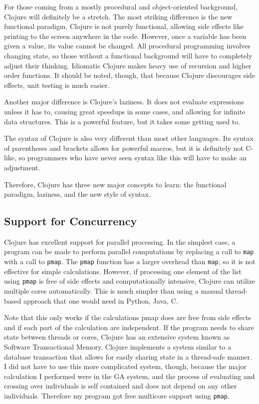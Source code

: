 \documentclass{article}
\begin{document}
For those coming from a mostly procedural and object-oriented background,
Clojure will definitely be a stretch.  The most striking difference is the new
functional paradigm.  Clojure is not purely functional, allowing side effects
like printing to the screen anywhere in the code.  However, once a variable has
been given a value, its value cannot be changed.  All procedural programming
involves changing state, so those without a functional background will have to
completely adjust their thinking.  Idiomatic Clojure makes heavy use of
recursion and higher order functions.  It should be noted, though, that because
Clojure discourages side effects, unit testing is much easier.

Another major difference is Clojure's laziness.  It does not evaluate
expressions unless it has to, causing great speedups in some cases, and allowing
for infinite data structures.  This is a powerful feature, but it takes some
getting used to.  

The syntax of Clojure is also very different than most other languages.  Its
syntax of parentheses and brackets allows for powerful macros, but it is
definitely not C-like, so programmers who have never seen syntax like this will
have to make an adjustment.

Therefore, Clojure has three new major concepts to learn: the functional
paradigm, laziness, and the new style of syntax.

\subsection{Support for Concurrency}

Clojure has excellent support for parallel processing.  In the simplest case, a
program can be made to perform parallel computations by replacing a call to
\texttt{map} with a call to \texttt{pmap}.  The \texttt{pmap} function has a
larger overhead than \texttt{map}, so it is not effective for simple
calculations.  However, if processing one element of the list using
\texttt{pmap} is free of side effects and computationally intensive, Clojure can
utilize multiple cores automatically.  This is much simpler than using a manual
thread-based approach that one would need in Python, Java, C.

Note that this only works if the calculations pmap does are free from side
effects and if each part of the calculation are independent.  If the program
needs to share state between threads or cores, Clojure has an extensive system
known as Software Transactional Memory.  Clojure implements a system similar to
a database transaction that allows for easily sharing state in a thread-safe
manner.  I did not have to use this more complicated system, though, because
the major calculation I performed were in the GA system, and the process of
evaluating and crossing over individuals is self contained and does not depend
on any other individuals.  Therefore my program got free multicore support
using \texttt{pmap}.
\end{document}

